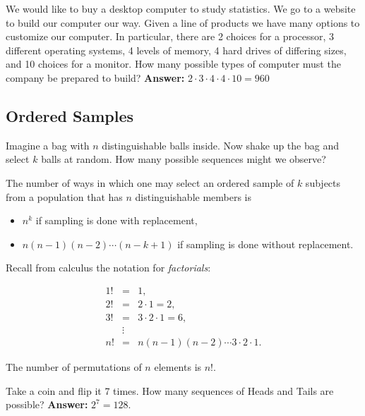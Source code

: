 \documentclass[captions=tableheading]{scrbook}
\begin{document}
\begin{example}
We would like to buy a desktop computer to study statistics. We go to a website to build our computer our way. Given a line of products we have many options to customize our computer. In particular, there are 2 choices for a processor, 3 different operating systems, 4 levels of memory, 4 hard drives of differing sizes, and 10 choices for a monitor. How many possible types of computer must the company be prepared to build? \textbf{Answer:} \(2\cdot3\cdot4\cdot4\cdot10=960\)
\end{example}
\subsection{Ordered Samples}
\label{sec-3-5-1}


Imagine a bag with \(n\) distinguishable balls inside. Now shake up the bag and select \(k\) balls at random. How many possible sequences might we observe?

\begin{prop}
The number of ways in which one may select an ordered sample of \(k\) subjects from a population that has \(n\) distinguishable members is

\begin{itemize}
\item \(n^{k}\) if sampling is done with replacement,
\item \(n(n-1)(n-2)\cdots(n-k+1)\) if sampling is done without replacement.
\end{itemize}

\end{prop}

Recall from calculus the notation for \emph{factorials}: 

\begin{eqnarray*}
1! & = & 1,\\
2! & = & 2\cdot1=2,\\
3! & = & 3\cdot2\cdot1=6,\\
 & \vdots\\
n! & = & n(n-1)(n-2)\cdots3\cdot2\cdot1.
\end{eqnarray*}

\begin{fact}
The number of permutations of \(n\) elements is \(n!\).
\end{fact}

\begin{example}
Take a coin and flip it 7 times. How many sequences of Heads and Tails are possible? \textbf{Answer:} \(2^{7}=128\).
\end{example}
\end{document}
